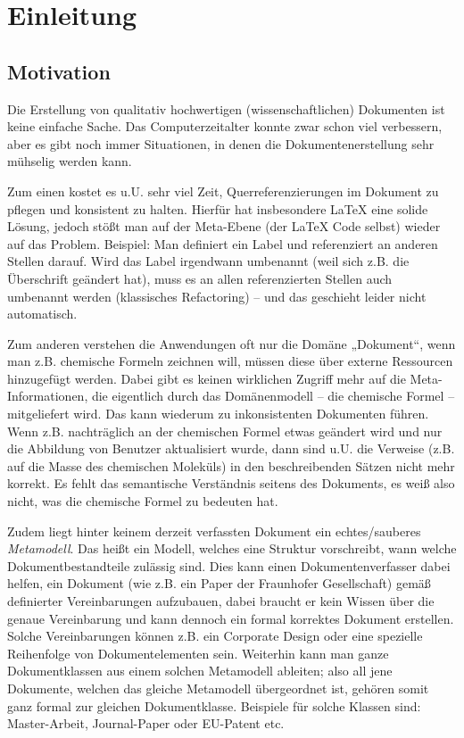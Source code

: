 \chapter{Einleitung}

\section{Motivation}

Die Erstellung von qualitativ hochwertigen (wissenschaftlichen) Dokumenten ist keine einfache Sache.
Das Computerzeitalter konnte zwar schon viel verbessern, aber es gibt noch
immer Situationen, in denen die Dokumentenerstellung sehr mühselig werden kann.

Zum einen kostet es u.U. sehr viel Zeit, Querreferenzierungen im Dokument zu
pflegen und konsistent zu halten.
Hierfür hat insbesondere LaTeX eine solide Lösung, jedoch stößt man auf der Meta-Ebene
(der LaTeX Code selbst) wieder auf das Problem. Beispiel: Man definiert ein
Label und referenziert an anderen Stellen darauf. Wird das Label irgendwann umbenannt
(weil sich z.B. die Überschrift geändert hat), muss es an allen referenzierten
Stellen auch umbenannt werden (klassisches Refactoring) -- und das geschieht
leider nicht automatisch.

Zum anderen verstehen die Anwendungen oft nur die Domäne „Dokument“,
wenn man z.B. chemische Formeln zeichnen will, müssen diese über externe
Ressourcen hinzugefügt werden. Dabei gibt es keinen wirklichen Zugriff
mehr auf die Meta-Informationen, die eigentlich durch das Domänenmodell
-- die chemische Formel -- mitgeliefert wird. Das kann wiederum zu inkonsistenten
Dokumenten führen. Wenn z.B. nachträglich an der chemischen Formel etwas
geändert wird und nur die Abbildung von Benutzer aktualisiert wurde,
dann sind u.U. die Verweise
(z.B. auf die Masse des chemischen Moleküls)
in den beschreibenden Sätzen nicht mehr korrekt.
Es fehlt das semantische Verständnis seitens des Dokuments, es weiß also nicht,
was die chemische Formel zu bedeuten hat.

Zudem liegt hinter keinem derzeit verfassten Dokument ein echtes/sauberes \emph{Metamodell}.
Das heißt ein Modell, welches eine Struktur vorschreibt, wann welche Dokumentbestandteile
zulässig sind.
Dies kann einen Dokumentenverfasser dabei helfen, ein Dokument (wie z.B. ein Paper der
Fraunhofer Gesellschaft) gemäß definierter Vereinbarungen aufzubauen,
dabei braucht er kein Wissen über die genaue Vereinbarung und kann
dennoch ein formal korrektes Dokument erstellen.
Solche Vereinbarungen können z.B. ein Corporate Design oder eine spezielle Reihenfolge
von Dokumentelementen sein.
Weiterhin kann man ganze Dokumentklassen aus einem solchen Metamodell ableiten;
also all jene Dokumente, welchen das gleiche
Metamodell übergeordnet ist, gehören somit ganz formal zur gleichen Dokumentklasse.
Beispiele für solche Klassen sind: Master-Arbeit, Journal-Paper oder EU-Patent etc.

